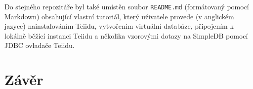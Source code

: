 \documentclass[oneside,12pt,final]{fithesis2}
\begin{document}
Do stejného repozitáře byl také umístěn soubor \texttt{README.md} (formátovaný pomocí Markdown) obsahující vlastní tutoriál, který uživatele provede (v anglickém jazyce) nainstalováním Teiidu, vytvořením virtuální databáze, připojením k lokálně běžící instanci Teiidu a několika vzorovými dotazy na SimpleDB pomocí JDBC ovladače Teiidu.
\chapter{Závěr}

\nocite{*}
\end{document}
